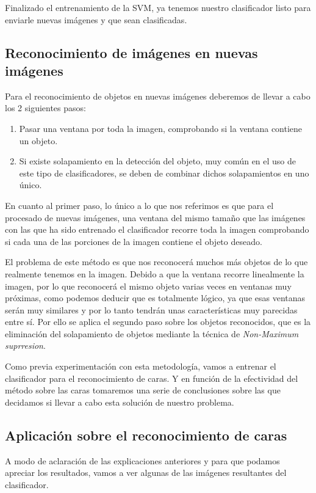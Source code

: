  Finalizado el entrenamiento de la SVM, ya tenemos nuestro clasificador listo para enviarle nuevas imágenes y que sean clasificadas.
 
\subsection{Reconocimiento de imágenes en nuevas imágenes}
Para el reconocimiento de objetos en nuevas imágenes deberemos de llevar a cabo los 2 siguientes pasos:

\begin{enumerate}[1.]
  \item Pasar una ventana por toda la imagen, comprobando si la ventana contiene un objeto.
  \item Si existe solapamiento en la detección del objeto, muy común en el uso de este tipo de clasificadores, se deben de combinar dichos solapamientos en uno único.
\end{enumerate}

En cuanto al primer paso, lo único a lo que nos referimos es que para el procesado de nuevas imágenes, una ventana del mismo tamaño que las imágenes con las que ha sido entrenado el clasificador recorre toda la imagen comprobando si cada una de las porciones de la imagen contiene el objeto deseado.

El problema de este método es que nos reconocerá muchos más objetos de lo que realmente tenemos en la imagen. Debido a que la ventana recorre linealmente la imagen, por lo que reconocerá el mismo objeto varias veces en ventanas muy próximas, como podemos deducir que es totalmente lógico, ya que esas ventanas serán muy similares y por lo tanto tendrán unas características muy parecidas entre sí. Por ello se aplica el segundo paso sobre los objetos reconocidos, que es la eliminación del solapamiento de objetos mediante la técnica de \textit{Non-Maximum suprresion}.

Como previa experimentación con esta metodología, vamos a entrenar el clasificador para el reconocimiento de caras. Y en función de la efectividad del método sobre las caras tomaremos una serie de conclusiones sobre las que decidamos si llevar a cabo esta solución de nuestro problema.

\subsection{Aplicación sobre el reconocimiento de caras}

A modo de aclaración de las explicaciones anteriores y para que podamos apreciar los resultados, vamos a ver algunas de las imágenes resultantes del clasificador.

